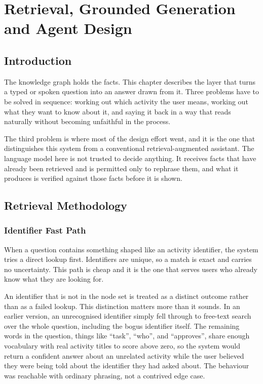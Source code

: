 \chapter{Retrieval, Grounded Generation and Agent Design}

\section*{Introduction}

The knowledge graph holds the facts. This chapter describes the layer that turns a typed or spoken question into an answer drawn from it. Three problems have to be solved in sequence: working out which activity the user means, working out what they want to know about it, and saying it back in a way that reads naturally without becoming unfaithful in the process.

The third problem is where most of the design effort went, and it is the one that distinguishes this system from a conventional retrieval-augmented assistant. The language model here is not trusted to decide anything. It receives facts that have already been retrieved and is permitted only to rephrase them, and what it produces is verified against those facts before it is shown.

\section{Retrieval Methodology}

\subsection{Identifier Fast Path}

When a question contains something shaped like an activity identifier, the system tries a direct lookup first. Identifiers are unique, so a match is exact and carries no uncertainty. This path is cheap and it is the one that serves users who already know what they are looking for.

An identifier that is not in the node set is treated as a distinct outcome rather than as a failed lookup. This distinction matters more than it sounds. In an earlier version, an unrecognised identifier simply fell through to free-text search over the whole question, including the bogus identifier itself. The remaining words in the question, things like ``task'', ``who'', and ``approves'', share enough vocabulary with real activity titles to score above zero, so the system would return a confident answer about an unrelated activity while the user believed they were being told about the identifier they had asked about. The behaviour was reachable with ordinary phrasing, not a contrived edge case.

